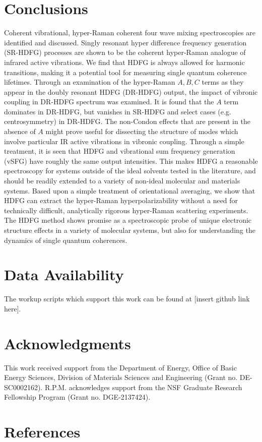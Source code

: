 \documentclass[aip, jcp, reprint, onecolumn]{revtex4-2}
\begin{document}
\section{Conclusions}
Coherent vibrational, hyper-Raman coherent four wave mixing spectroscopies are identified and discussed.
Singly resonant hyper difference frequency generation (SR-HDFG) processes are shown to be the coherent hyper-Raman analogue of infrared active vibrations.
We find that HDFG is always allowed for harmonic transitions, making it a potential tool for measuring single quantum coherence lifetimes. 
Through an examination of the hyper-Raman $A,B,C$ terms as they appear in the doubly resonant HDFG (DR-HDFG) output, the impact of vibronic coupling in DR-HDFG spectrum was examined.
It is found that the $A$ term dominates in DR-HDFG, but vanishes in SR-HDFG and select cases (e.g. centrosymmetry) in DR-HDFG. 
The non-Condon effects that are present in the absence of $A$ might prove useful for dissecting the structure of modes which involve particular IR active vibrations in vibronic coupling.
Through a simple treatment, it is seen that HDFG and vibrational sum frequency generation (vSFG) have roughly the same output intensities. 
This makes HDFG a reasonable spectroscopy for systems outside of the ideal solvents tested in the literature, and should be readily extended to a variety of non-ideal molecular and materials systems. 
Based upon a simple treatment of orientational averaging, we show that HDFG can extract the hyper-Raman hyperpolarizability without a need for technically difficult, analytically rigorous hyper-Raman scattering experiments. 
The HDFG method shows promise as a spectroscopic probe of unique electronic structure effects in a variety of molecular systems, but also for understanding the dynamics of single quantum coherences. 
\section{Data Availability}
The workup scripts which support this work can be found at [insert github link here].

\section{Acknowledgments}
This work received support from the Department of Energy, Office of Basic Energy Sciences, Division of Materials Sciences and Engineering (Grant no. DE-SC0002162).
R.P.M. acknowledges support from the NSF Graduate Research Fellowship Program (Grant no. DGE-2137424). 



\section{References}

\end{document}
